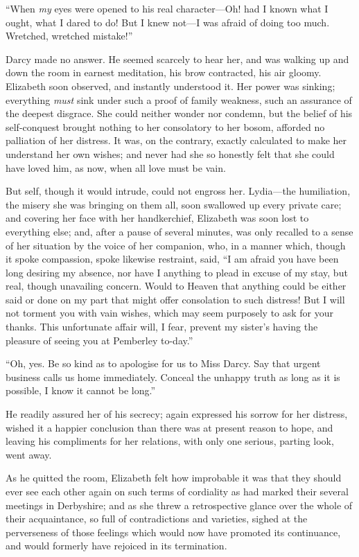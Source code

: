 ``When \emph{my} eyes were opened to his real character---Oh! had I
known what I ought, what I dared to do!  But I knew not---I
was afraid of doing too much.  Wretched, wretched mistake!''

Darcy made no answer.  He seemed scarcely to hear her, and
was walking up and down the room in earnest meditation, his
brow contracted, his air gloomy.  Elizabeth soon observed, and
instantly understood it.  Her power was sinking; everything
\emph{must} sink under such a proof of family weakness, such an
assurance of the deepest disgrace.  She could neither wonder
nor condemn, but the belief of his self-conquest brought nothing
to her consolatory to her bosom, afforded no palliation of her
distress.  It was, on the contrary, exactly calculated to make
her understand her own wishes; and never had she so honestly felt
that she could have loved him, as now, when all love must be vain.

But self, though it would intrude, could not engross her.
Lydia---the humiliation, the misery she was bringing on them all,
soon swallowed up every private care; and covering her face with
her handkerchief, Elizabeth was soon lost to everything else;
and, after a pause of several minutes, was only recalled to a
sense of her situation by the voice of her companion, who, in a
manner which, though it spoke compassion, spoke likewise restraint,
said, ``I am afraid you have been long desiring my absence, nor
have I anything to plead in excuse of my stay, but real, though
unavailing concern.  Would to Heaven that anything could be
either said or done on my part that might offer consolation to
such distress!  But I will not torment you with vain wishes, which
may seem purposely to ask for your thanks.  This unfortunate
affair will, I fear, prevent my sister's having the pleasure of
seeing you at Pemberley to-day.''

``Oh, yes.  Be so kind as to apologise for us to Miss Darcy.  Say
that urgent business calls us home immediately.  Conceal the
unhappy truth as long as it is possible, I know it cannot be long.''

He readily assured her of his secrecy; again expressed his sorrow
for her distress, wished it a happier conclusion than there was
at present reason to hope, and leaving his compliments for her
relations, with only one serious, parting look, went away.

As he quitted the room, Elizabeth felt how improbable it was
that they should ever see each other again on such terms of
cordiality as had marked their several meetings in Derbyshire;
and as she threw a retrospective glance over the whole of their
acquaintance, so full of contradictions and varieties, sighed
at the perverseness of those feelings which would now have
promoted its continuance, and would formerly have rejoiced in
its termination.

